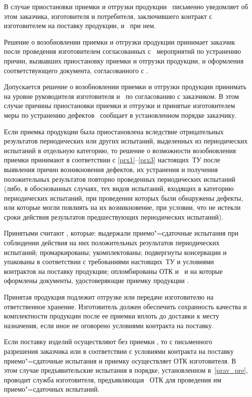 \point
\label{prp1}
В случае приостановки приемки и отгрузки продукции \client \ письменно уведомляет об этом заказчика, изготовителя и потребителя, заключившего контракт с изготовителем на поставку продукции, и \client \ при нем.

\point
\label{prp2}
Решение о возобновлении приемки и отгрузки продукции принимает заказчик после проведения изготовителем согласованных с \client \ мероприятий по устранению причин, вызвавших приостановку приемки и отгрузки продукции, и оформления соответствующего документа, согласованного с \client.

Допускается решение о возобновлении приемки и отгрузки продукции принимать на уровне руководителя изготовителя и \client \ по согласованию с заказчиком. В этом случае причины приостановки приемки и отгрузки и принятые изготовителем меры по устранению дефектов \client \ сообщает в установленном порядке заказчику.

Если приемка продукции была приостановлена вследствие отрицательных результатов периодических или других испытаний, выделенных из периодических испытаний в отдельную категорию, то решение о возможности возобновления приемки принимают в соответствии с \ref{prx1}--\ref{prx3} настоящих~ТУ после выявления причин возникновения дефектов, их устранения и получения положительных результатов повторно проведенных периодических испытаний (либо, в обоснованных случаях, тех видов испытаний, входящих в категорию периодических испытаний, при проведении которых были обнаружены дефекты, или которые могли повлиять на их возникновение, при условии, что не истекли сроки действия результатов предшествующих периодических испытаний).

\point
Принятыми считают \dut, которые: выдержали приемо"=сдаточные испытания при соблюдении действия на них положительных результатов периодических испытаний; промаркированы; укомплектованы; подвергнуты консервации и упакованы в соответствии с требованиями настоящих~ТУ и условиями контрактов на поставку продукции; опломбированы ОТК и \client \ и на которые оформлены документы, удостоверяющие приемку продукции \client.

\point
Принятая продукция подлежит отгрузке или передаче изготовителю на ответственное хранение. Изготовитель должен обеспечить сохранность качества и комплектности продукции после ее приемки вплоть до доставки к месту назначения, если иное не оговорено условиями контракта на поставку.

\point
Если поставку изделий осуществляют без приемки \client, то с письменного разрешения заказчика или в соответствии с условиями контракта на поставку приемо"=сдаточные испытания и приемку осуществляет ОТК изготовителя. В этом случае предъявительские испытания в порядке, установленном в~\ref{prav_pre}, проводит служба изготовителя, предъявляющая \dut \ ОТК для проведения им приемо"=сдаточных испытаний.


